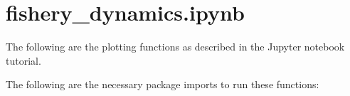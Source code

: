 \documentclass[letterpaper,10pt,english]{book}
\begin{document}
\section{fishery\_dynamics.ipynb}
\label{\detokenize{A3_plotting_code:fishery-dynamics-ipynb}}
\sphinxAtStartPar
The following are the plotting functions as described in the  Jupyter notebook tutorial.

\sphinxAtStartPar
The following are the necessary package imports to run these functions:

\begin{sphinxVerbatim}[commandchars=\\\{\}]
   
   

     
\end{sphinxVerbatim}
\end{document}
